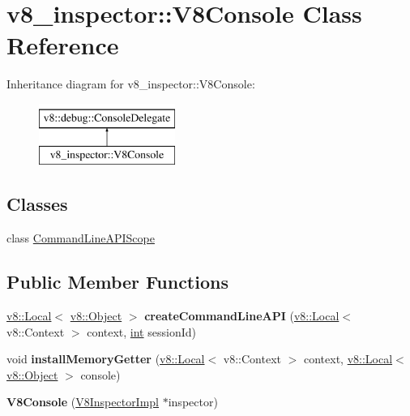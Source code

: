 \hypertarget{classv8__inspector_1_1V8Console}{}\section{v8\+\_\+inspector\+:\+:V8\+Console Class Reference}
\label{classv8__inspector_1_1V8Console}
Inheritance diagram for v8\+\_\+inspector\+:\+:V8\+Console\+:\begin{figure}[H]
\begin{center}
\leavevmode
\includegraphics[height=2.000000cm]{classv8__inspector_1_1V8Console}
\end{center}
\end{figure}
\subsection*{Classes}
\begin{DoxyCompactItemize}
\item 
class \mbox{\hyperlink{classv8__inspector_1_1V8Console_1_1CommandLineAPIScope}{Command\+Line\+A\+P\+I\+Scope}}
\end{DoxyCompactItemize}
\subsection*{Public Member Functions}
\begin{DoxyCompactItemize}
\item 
\mbox{\label{classv8__inspector_1_1V8Console_a496049659e66a3c00d8df4c3d65539e3}} 
\mbox{\hyperlink{classv8_1_1Local}{v8\+::\+Local}}$<$ \mbox{\hyperlink{classv8_1_1Object}{v8\+::\+Object}} $>$ {\bfseries create\+Command\+Line\+A\+PI} (\mbox{\hyperlink{classv8_1_1Local}{v8\+::\+Local}}$<$ v8\+::\+Context $>$ context, \mbox{\hyperlink{classint}{int}} session\+Id)
\item 
\mbox{\label{classv8__inspector_1_1V8Console_a4f69e222648703f7cefa8e239160d2d4}} 
void {\bfseries install\+Memory\+Getter} (\mbox{\hyperlink{classv8_1_1Local}{v8\+::\+Local}}$<$ v8\+::\+Context $>$ context, \mbox{\hyperlink{classv8_1_1Local}{v8\+::\+Local}}$<$ \mbox{\hyperlink{classv8_1_1Object}{v8\+::\+Object}} $>$ console)
\item 
\mbox{\label{classv8__inspector_1_1V8Console_aaf9a5caa0b98193f4459ce2b3ac868bc}} 
{\bfseries V8\+Console} (\mbox{\hyperlink{classv8__inspector_1_1V8InspectorImpl}{V8\+Inspector\+Impl}} $\ast$inspector)
\end{DoxyCompactItemize}


